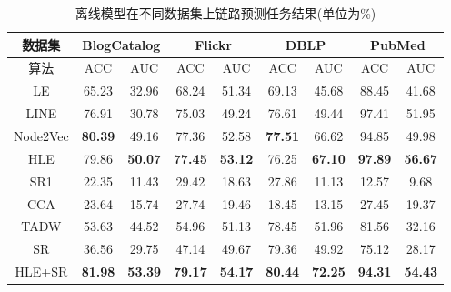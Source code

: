 \begin{table}[]
	\centering
	\caption{离线模型在不同数据集上链路预测任务结果(单位为\%)}
	\label{tab:off_link_prediction}
	\begin{tabular}{|c||c|c||c|c||c|c||c|c|}
		\hline
		数据集      & \multicolumn{2}{c||}{BlogCatalog} & \multicolumn{2}{c||}{Flickr}     & \multicolumn{2}{c||}{DBLP}   & \multicolumn{2}{c|}{PubMed}     \\ \hline\hline
		算法       & ACC             & AUC            & ACC            & AUC            & ACC            & AUC            & ACC            & AUC            \\ \hline
		LE       & 65.23           & 32.96          & 68.24          & 51.34          & 69.13          & 45.68          & 88.45          & 41.68          \\ \hline
		LINE     & 76.91           & 30.78          & 75.03          & 49.24          & 76.61          & 49.44          & 97.41          & 51.95 \\ \hline
		Node2Vec & \textbf{80.39}  & 49.16          & 77.36          & 52.58          & \textbf{77.51} & 66.62          & 94.85          & 49.98          \\ \hline
		HLE      & 79.86           & \textbf{50.07} & \textbf{77.45} & \textbf{53.12} & 76.25          & \textbf{67.10} & \textbf{97.89} & \textbf{56.67}          \\ \hline\hline
		SR1      & 22.35           & 11.43          & 29.42          & 18.63          & 27.86          & 11.13          & 12.57          & 9.68           \\ \hline\hline
		CCA      & 23.64           & 15.74          & 27.74          & 19.46          & 18.45          & 13.15          & 27.45          & 19.37          \\ \hline
		TADW     & 53.63           & 44.52          & 54.96          & 51.13 & 78.45          & 51.96          & 81.56 & 32.16          \\ \hline
		SR       & 36.56           & 29.75          & 47.14          & 49.67          & 79.36          & 49.92          & 75.12          & 28.17          \\ \hline
		HLE+SR   & \textbf{81.98}  & \textbf{53.39} & \textbf{79.17} & \textbf{54.17}          & \textbf{80.44} & \textbf{72.25} & \textbf{94.31}          & \textbf{54.43} \\ \hline
	\end{tabular}
\end{table}

